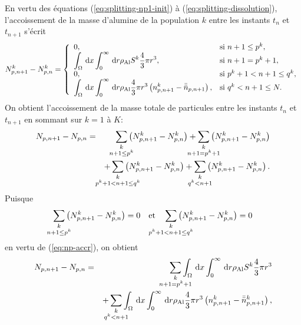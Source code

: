 En vertu des équations (\ref{eq:splitting-np1-init}) à
(\ref{eq:splitting-dissolution}), l'accoissement de la masse d'alumine
de la population $k$ entre les instants $t_{n}$ et $t_{n + 1}$ s'écrit
\begin{equation}\label{eq:np-accr}
  N_{p,n+1}^k - N_{p,n}^k = \left\{
  \begin{array}{ll}
    0, & \text{si }n+1 \leq p^k, \\
    \displaystyle\int_\Omega\,\mathrm dx\displaystyle\int_0^\infty\,\mathrm dr \rho_\mathrm{Al} S^k\frac{4}{3}\pi
    r^3, & \text{si }n+1 = p^k + 1, \\
    0, & \text{si }p^k+1 < n+1 \leq q^k, \\
    \displaystyle\int_\Omega\,\mathrm dx\displaystyle\int_0^\infty\,\mathrm dr \rho_\mathrm{Al} \frac{4}{3}\pi
    r^3\left( n_{p,n+1}^k - \bar{\bar n}_{p,n+1} \right), &\text{si } q^k < n+1 \leq N.
  \end{array}
  \right.
\end{equation}
On obtient l'accoissement de la masse totale de particules entre les
instants $t_n$ et $t_{n+1}$ en sommant sur $k = 1$ à $K$:
\begin{eqnarray*}
  N_{p,n+1} - N_{p,n}
  &=& \sum_{\mathclap{\substack{k\\ n+1 \leq p^k}}} \parent{N_{p,n+1}^k - N_{p,n}^k} %
  + \sum_{\mathclap{\substack{k\\ n+1 = p^k + 1}}} \parent{N_{p,n+1}^k - N_{p,n}^k}\\
  && + \sum_{\mathclap{\substack{k\\ p^k + 1 < n+1 \leq q^k}}} \parent{N_{p,n+1}^k - N_{p,n}^k} %
  + \sum_{\mathclap{\substack{k\\ q^k < n+1}}} \parent{N_{p,n+1}^k -
    N_{p,n}^k}.
\end{eqnarray*}
Puisque
\begin{equation*}
\sum_{\mathclap{\substack{k\\ n+1 \leq p^k}}} \parent{N_{p,n+1}^k - N_{p,n}^k} = 0 \quad \text{et}\quad \sum_{\mathclap{\substack{k\\ p^k + 1 < n+1 \leq q^k}}} \parent{N_{p,n+1}^k - N_{p,n}^k} = 0
\end{equation*}
en vertu de (\ref{eq:np-accr}), on obtient
\begin{eqnarray}
  N_{p,n+1} - N_{p,n}
  &=&\sum_{\mathclap{\substack{k\\ n+1 = p^k+1}}} \displaystyle\int_\Omega\intd{x}\displaystyle\int_0^\infty\intd{r} \aluminadensity S^k\frac{4}{3}\pi
  r^3 \nonumber\\
  && + \sum_{\mathclap{\substack{k \\ q^k < n+1}}} \displaystyle\int_\Omega\intd{x}\displaystyle\int_0^\infty \intd{r}\aluminadensity \frac{4}{3}\pi
    r^3\parent{n_{p,n+1}^k - \bar{\bar n}_{p,n+1}^k}, \label{eq:np-masse-1}
\end{eqnarray}

